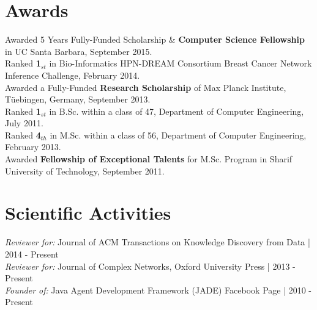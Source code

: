\documentclass[letter]{res}
\begin{document}
\begin{resume}
\begin{enumerate}[leftmargin=-.01in]
		\end{enumerate}
		
		
		\section{Awards}
		Awarded 5 Years Fully-Funded Scholarship \& \textbf{Computer Science Fellowship} in UC Santa Barbara, September 2015.\\
		Ranked \textbf{1}$_{st}$ in Bio-Informatics HPN-DREAM Consortium Breast Cancer Network Inference Challenge, February 2014.\\
		Awarded a Fully-Funded \textbf{Research Scholarship} of Max Planck Institute, Tüebingen, Germany, September 2013.\\
		Ranked \textbf{1}$_{st}$ in B.Sc. within a class of 47, Department of Computer Engineering, July 2011.\\
		Ranked \textbf{4}$_{th}$ in M.Sc. within a class of 56, Department of Computer Engineering, February 2013.\\
		Awarded \textbf{Fellowship of Exceptional Talents} for M.Sc. Program in Sharif University of Technology, September 2011.
		
		
		\section{Scientific Activities}
		{\sl Reviewer for:  }Journal of ACM Transactions on Knowledge Discovery from Data | 2014 - Present\\
		{\sl Reviewer for:  }Journal of Complex Networks, Oxford University Press | 2013 - Present\\
		{\sl Founder of:  }Java Agent Development Framework (JADE) Facebook Page | 2010 - Present
		
		
		

\end{resume}
\end{document}
